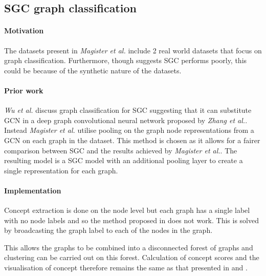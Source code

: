 \subsection{SGC graph classification}
\paragraph{Motivation}
The datasets present in \textit{Magister et al.}\cite{magister2021gcexplainer} include 2 real world datasets that focus on graph classification.
Furthermore, though  suggests SGC performs poorly, this could be because of the synthetic nature of the datasets.

\paragraph{Prior work}
\textit{Wu et al.}\cite{wu2019simplifying} discuss graph classification for SGC suggesting that it can substitute GCN in a deep graph convolutional neural network proposed by \textit{Zhang et al.}\cite{zhang2018end}.
Instead \textit{Magister et al.}\cite{magister2021gcexplainer} utilise pooling on the graph node representations from a GCN on each graph in the dataset.
This method is chosen as it allows for a fairer comparison between SGC and the results achieved by \textit{Magister et al.}.
The resulting model is a SGC model with an additional pooling layer to create a single representation for each graph.

\paragraph{Implementation}
Concept extraction is done on the node level but each graph has a single label with no node labels and so the method proposed in  does not work.
This is solved by broadcasting the graph label to each of the nodes in the graph.

This allows the graphs to be combined into a disconnected forest of graphs and clustering can be carried out on this forest.
Calculation of concept scores and the visualisation of concept therefore remains the same as that presented in  and .

